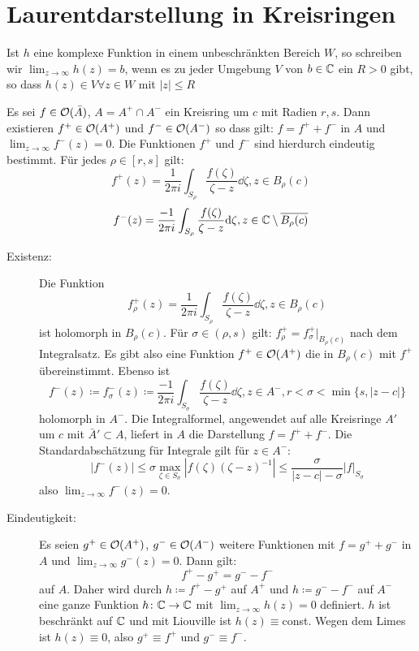 \section{Laurentdarstellung in Kreisringen}
\begin{definition}
	Ist $ h $ eine komplexe Funktion in einem unbeschr\"ankten Bereich $ W $, so schreiben wir $ \lim_{z\to\infty}h(z)=b $, wenn es zu jeder Umgebung $ V $ von $ b\in\mathbb{C} $ ein $ R>0 $ gibt, so dass $ h(z)\in V\forall z\in W $ mit $ |z|\leq R $
\end{definition}
\begin{satz}
	Es sei $ f\in\mathcal O(\bar A) $, $ A=A^+\cap A^- $ ein Kreisring um $ c $ mit Radien $ r,s $. Dann existieren $ f^+\in\mathcal O(A^+) $ und $ f^-\in\mathcal O(A^-) $ so dass gilt: $ f=f^++f^- $ in $ A $ und $ \lim_{z\to\infty} f^-(z)=0 $. Die Funktionen $ f^+ $ und $ f^- $ sind hierdurch eindeutig bestimmt. F\"ur jedes $ \rho\in[r,s] $ gilt:
	\[ f^+(z)=\frac{1}{2\pi i}\int_{S_\rho}\frac{f(\zeta)}{\zeta-z}\dd\zeta,z\in B_\rho(c) \]
	\[ f^-(z)=\frac{-1}{2\pi i}\int_{S_\rho}\frac{f(\zeta)}{\zeta-z}\mathrm d\zeta,z\in\mathbb{C}\setminus\overline{B_\rho(c)} \]
\end{satz}
\begin{beweis}
	\begin{description}
		\item[Existenz:] Die Funktion \[ f^+_\rho(z)=\frac{1}{2\pi i}\int_{S_{\rho}}\frac{f(\zeta)}{\zeta-z}\dd\zeta, z\in B_\rho(c) \] ist holomorph in $ B_\rho(c) $. F\"ur $ \sigma\in(\rho, s) $ gilt: $ f^+_{\rho}=f^+_\sigma|_{B_\rho(c)} $ nach dem Integralsatz. Es gibt also eine Funktion $ f^+\in\mathcal O(A^+) $ die in $ B_\rho(c) $	mit $ f^+ $ \"ubereinstimmt. Ebenso ist
		\[ f^-(z)\coloneqq f^-_\sigma(z)\coloneqq\frac{-1}{2\pi i}\int_{S_\sigma}\frac{f(\zeta)}{\zeta-z}\dd\zeta,z\in A^-, r<\sigma<\min\lbrace s,|z-c|\rbrace \]
		holomorph in $ A^- $. Die Integralformel, angewendet auf alle Kreisringe $ A' $ um $ c $ mit $ \bar A'\subset A $, liefert in $ A $ die Darstellung $ f=f^++f^- $. Die Standardabsch\"atzung f\"ur Integrale gilt f\"ur $ z\in A^- $:
		\[ |f^-(z)|\leq\sigma\max_{\zeta\in S_\sigma}|f(\zeta)(\zeta-z)^{-1}|\leq\frac{\sigma}{|z-c|-\sigma}|f|_{S_\sigma} \]
		also $ \lim_{z\to\infty}f^-(z)=0 $.
		\item[Eindeutigkeit:] Es seien $ g^+\in\mathcal O(A^+) $, $ g^-\in\mathcal O(A^-) $ weitere Funktionen mit $ f=g^++g^- $ in $ A $ und $ \lim_{z\to\infty} g^-(z)=0 $. Dann gilt:
		\[ f^+-g^+=g^--f^- \]
		auf $ A $. Daher wird durch $ h\coloneqq f^+-g^+ $ auf $ A^+ $ und $ h\coloneqq g^--f^- $ auf $ A^- $ eine ganze Funktion $ h\colon\mathbb{C}\rightarrow\mathbb{C} $ mit $ \lim_{z\to\infty}h(z)=0 $ definiert. $ h $ ist beschr\"ankt auf $ \mathbb{C} $ und mit Liouville ist $ h(z)\equiv $const. Wegen dem Limes ist $ h(z)\equiv 0 $, also $ g^+\equiv f^+ $ und $ g^-\equiv f^- $.
	\end{description}
\end{beweis}
